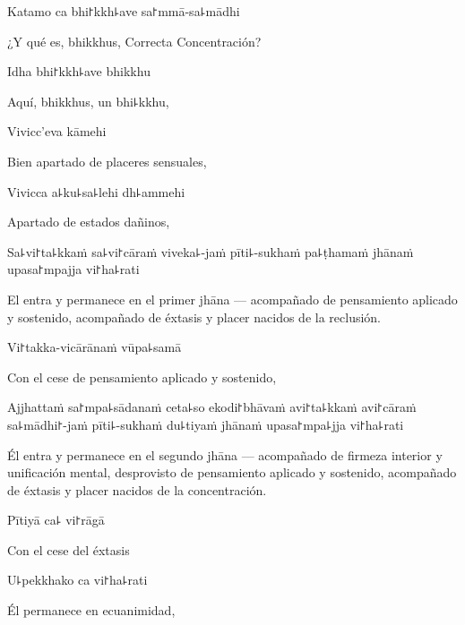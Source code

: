 Katamo ca bhi꜓kkh꜕ave sa꜓mmā-sa꜕mādhi

\begin{english}
	¿Y qué es, bhikkhus, Correcta Concentración?
\end{english}

Idha bhi꜓kkh꜕ave bhikkhu

\begin{english}
	Aquí, bhikkhus, un bhi꜕kkhu,
\end{english}

Vivicc'eva kāmehi

\begin{english}
	Bien apartado de placeres sensuales,
\end{english}

Vivicca a꜕ku꜕sa꜕lehi dh꜕ammehi

\begin{english}
	Apartado de estados dañinos,
\end{english}

Sa꜕vi꜓ta꜕kkaṁ sa꜕vi꜓cāraṁ viveka꜕-jaṁ pīti꜕-sukhaṁ pa꜕ṭhamaṁ jhānaṁ upasa꜓mpajja vi꜓ha꜕rati

\begin{english}
	El entra y permanece en el primer jhāna --- acompañado de pensamiento aplicado y sostenido, acompañado de éxtasis y placer nacidos de la reclusión.
\end{english}

Vi꜓takka-vicārānaṁ vūpa꜕samā

\begin{english}
	Con el cese de pensamiento aplicado y sostenido,
\end{english}

Ajjhattaṁ sa꜓mpa꜕sādanaṁ ceta꜕so ekodi꜓bhāvaṁ avi꜓ta꜕kkaṁ avi꜓cāraṁ sa꜕mādhi꜓-jaṁ pīti꜕-sukhaṁ du꜕tiyaṁ jhānaṁ upasa꜓mpa꜕jja vi꜓ha꜕rati

\begin{english}
	Él entra y permanece en el segundo jhāna  --- acompañado de firmeza interior y unificación mental, desprovisto de pensamiento aplicado y sostenido, acompañado de éxtasis y placer nacidos de la concentración.
\end{english}

Pītiyā ca꜕ vi꜓rāgā

\begin{english}
	Con el cese del éxtasis
\end{english}

U꜕pekkhako ca vi꜓ha꜕rati

\begin{english}
	Él permanece en ecuanimidad,
\end{english}

